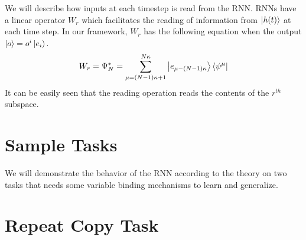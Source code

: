 \documentclass[11pt]{article}
\theoremstyle{definition}
\begin{document}
We will describe how inputs at each timestep is read from the RNN. RNNs have a linear operator $W_{r}$ which facilitates the reading of information from $\ket{h(t)}$ at each time step. In our framework, $W_{r}$ has the following equation when the output $\ket{o} = o^i \ket{e_i}$.
%
\begin{dmath}
    W_{r} = \Psi^*_N = \sum_{\mu=(N-1)\kappa + 1}^{N\kappa} \ket{e_{\mu - (N-1)\kappa}} \bra{\psi^{\mu}}
\end{dmath}
%
It can be easily seen that the reading operation reads the contents of the $r^{th}$ subspace.

\section{Sample Tasks}

We will demonstrate the behavior of the RNN according to the theory on two tasks that needs some variable binding mechanisms to learn and generalize.

\section{Repeat Copy Task}
\end{document}
